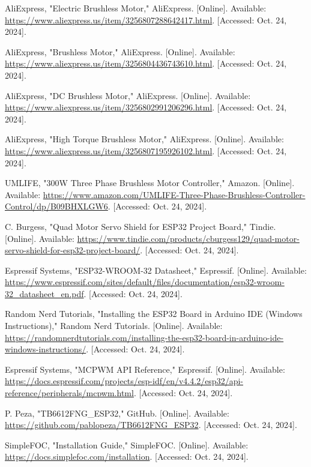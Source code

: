 \begin{thebibliography}{45}
	AliExpress, "Electric Brushless Motor," AliExpress. [Online]. Available: \url{https://www.aliexpress.us/item/3256807288642417.html}. [Accessed: Oct. 24, 2024]. 
	
	AliExpress, "Brushless Motor," AliExpress. [Online]. Available: \url{https://www.aliexpress.us/item/3256804436743610.html}. [Accessed: Oct. 24, 2024]. 
	
	AliExpress, "DC Brushless Motor," AliExpress. [Online]. Available: \url{https://www.aliexpress.us/item/3256802991206296.html}. [Accessed: Oct. 24, 2024]. 
	
	AliExpress, "High Torque Brushless Motor," AliExpress. [Online]. Available: \url{https://www.aliexpress.us/item/3256807195926102.html}. [Accessed: Oct. 24, 2024]. 
	
	UMLIFE, "300W Three Phase Brushless Motor Controller," Amazon. [Online]. Available: \url{https://www.amazon.com/UMLIFE-Three-Phase-Brushless-Controller-Control/dp/B09BHXLGW6}. [Accessed: Oct. 24, 2024]. 
	
	C. Burgess, "Quad Motor Servo Shield for ESP32 Project Board," Tindie. [Online]. Available: \url{https://www.tindie.com/products/cburgess129/quad-motor-servo-shield-for-esp32-project-board/}. [Accessed: Oct. 24, 2024]. 
	
	Espressif Systems, "ESP32-WROOM-32 Datasheet," Espressif. [Online]. Available: \url{https://www.espressif.com/sites/default/files/documentation/esp32-wroom-32_datasheet_en.pdf}. [Accessed: Oct. 24, 2024]. 
	
	Random Nerd Tutorials, "Installing the ESP32 Board in Arduino IDE (Windows Instructions)," Random Nerd Tutorials. [Online]. Available: \url{https://randomnerdtutorials.com/installing-the-esp32-board-in-arduino-ide-windows-instructions/}. [Accessed: Oct. 24, 2024]. 
	
	Espressif Systems, "MCPWM API Reference," Espressif. [Online]. Available: \url{https://docs.espressif.com/projects/esp-idf/en/v4.4.2/esp32/api-reference/peripherals/mcpwm.html}. [Accessed: Oct. 24, 2024]. 
	
	P. Peza, "TB6612FNG\_ESP32," GitHub. [Online]. Available: \url{https://github.com/pablopeza/TB6612FNG_ESP32}. [Accessed: Oct. 24, 2024]. 
	
	SimpleFOC, "Installation Guide," SimpleFOC. [Online]. Available: \url{https://docs.simplefoc.com/installation}. [Accessed: Oct. 24, 2024]. 
	

\end{thebibliography}
